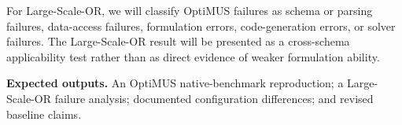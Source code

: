 \documentclass[11pt]{article}
\newcommand{\expected}{\noindent\textbf{Expected outputs.} }
\begin{document}
\begin{enumerate}[label=(R2.Major.\arabic*),leftmargin=*]
For Large-Scale-OR, we will classify OptiMUS failures as schema or parsing
failures, data-access failures, formulation errors, code-generation errors,
or solver failures. The Large-Scale-OR result will be presented as a
cross-schema applicability test rather than as direct evidence of weaker
formulation ability.

\expected An OptiMUS native-benchmark reproduction; a Large-Scale-OR failure
analysis; documented configuration differences; and revised baseline claims.

\newpage




\end{enumerate}
\end{document}
